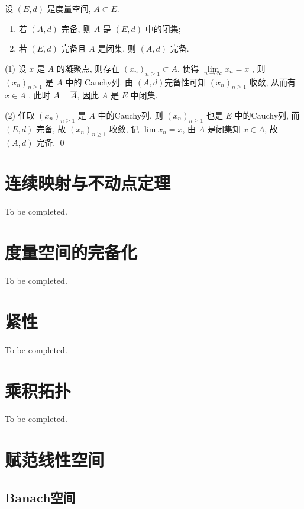 \begin{Thm}
     设 $ (E, d) $ 是度量空间, $ A\subset E $. 
     \begin{enumerate}[(1)]
          \item 若 $ (A, d) $ 完备, 则 $ A $ 是 $ (E, d) $ 中的闭集;
          \item 若 $ (E, d) $ 完备且 $ A $ 是闭集, 则 $ (A, d) $ 完备. 
     \end{enumerate} 
\end{Thm}
\begin{Prf}
     (1) 设 $ x $ 是 $ A $ 的凝聚点, 则存在 $ (x_{n})_{n\geqslant1}\subset A $, 使得 $ \lim\limits_{n\to\infty}x_{n}=x $ , 则 $ (x_{n})_{n\geqslant1} $ 是 $ A $ 中的 Cauchy列. 由 $ (A, d) $完备性可知 $ (x_{n})_{n\geqslant1} $ 收敛, 从而有 $ x\in A $ , 此时 $ A=\baro{A} $, 因此 $ A $ 是 $ E $ 中闭集. 

     (2) 任取 $ (x_{n})_{n\geqslant1} $ 是 $ A $ 中的Cauchy列, 则 $ (x_{n})_{n\geqslant1} $ 也是 $ E $ 中的Cauchy列, 而 $ (E, d) $ 完备, 故 $ (x_{n})_{n\geqslant1} $ 收敛, 记 $ \lim\limits x_{n}=x $, 由 $ A $ 是闭集知 $ x\in A $, 故 $ (A, d) $ 完备. \qed
\end{Prf}
\section{连续映射与不动点定理}
	To be completed.
\section{度量空间的完备化}
	To be completed.
\section{紧性}
	To be completed.
\section{乘积拓扑}
	To be completed.
\section{赋范线性空间}
	
	\subsection{Banach空间}
	
